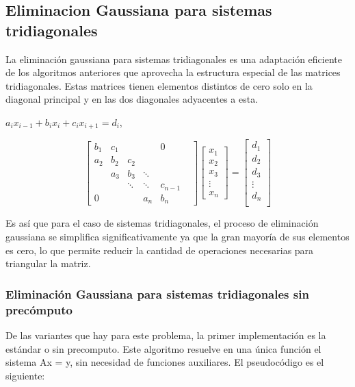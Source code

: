 \subsection{Eliminacion Gaussiana para sistemas tridiagonales}
\label{tridiagonal}
La eliminación gaussiana para sistemas tridiagonales es una adaptación eficiente de los algoritmos anteriores que aprovecha la estructura especial de las matrices tridiagonales. Estas matrices tienen elementos distintos de cero solo en la diagonal principal y en las dos diagonales adyacentes a esta.
\begin{center}
    $a_{i}x_{i-1}+b_{i}x_{i}+c_{i}x_{i+1} = d_{i}$,
\end{center}
    
    \[ \begin{bmatrix}
b_1 & c_1 & & & 0\\
a_2 & b_2 & c_2 & & & \\
    & a_3 & b_3 & \ddots & \\
    &    & \ddots &  \ddots&c_{n-1}\\
0   &    &   & a_n & b_n
     \end{bmatrix}
  \begin{bmatrix}
        x_{1}\\
        x_{2} \\
        x_{3}\\ 
        \vdots\\ 
        x_{n}  
 \end{bmatrix}
 =
 \begin{bmatrix}
     d_{1} \\
     d_{2} \\
     d_{3} \\
     \vdots \\
     d_{n} \\
 \end{bmatrix}
 \] 

 Es así que para el caso de sistemas tridiagonales, el proceso de eliminación gaussiana se simplifica significativamente ya que la gran mayoría de sus elementos es cero, lo que permite reducir la cantidad de operaciones necesarias para triangular la matriz.

 \subsubsection{Eliminación Gaussiana para sistemas tridiagonales sin precómputo}

 De las variantes que hay para este problema, la primer implementación es la estándar o sin precomputo. Este algoritmo resuelve en una única función el sistema Ax = y, sin necesidad de funciones auxiliares. El pseudocódigo es el siguiente:

